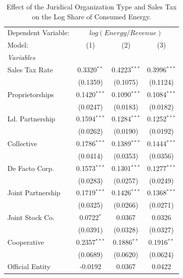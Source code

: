 \documentclass[
  12pt]{article}
\begin{document}
\begin{table}

\caption{\label{tbl-reg-energy}Effect of the Juridical Organization Type
and Sales Tax on the Log Share of Consumed Energy.}

\begin{minipage}{\linewidth}

\begingroup
\centering
\begin{tabular}{lccc}
   \tabularnewline \midrule \midrule
   Dependent Variable: & \multicolumn{3}{c}{\(log(Energy/Revenue)\)}\\
   Model:            & (1)            & (2)            & (3)\\  
   \midrule
   \emph{Variables}\\
   Sales Tax Rate    & 0.3320$^{**}$  & 0.4223$^{***}$ & 0.3996$^{***}$\\   
                     & (0.1359)       & (0.1075)       & (0.1124)\\   
   Proprietorships   & 0.1420$^{***}$ & 0.1090$^{***}$ & 0.1084$^{***}$\\   
                     & (0.0247)       & (0.0183)       & (0.0182)\\   
   Ld. Partnership   & 0.1594$^{***}$ & 0.1284$^{***}$ & 0.1252$^{***}$\\   
                     & (0.0262)       & (0.0190)       & (0.0192)\\   
   Collective        & 0.1786$^{***}$ & 0.1389$^{***}$ & 0.1444$^{***}$\\   
                     & (0.0414)       & (0.0353)       & (0.0356)\\   
   De Facto Corp.    & 0.1573$^{***}$ & 0.1301$^{***}$ & 0.1277$^{***}$\\   
                     & (0.0283)       & (0.0257)       & (0.0249)\\   
   Joint Partnership & 0.1719$^{***}$ & 0.1426$^{***}$ & 0.1368$^{***}$\\   
                     & (0.0325)       & (0.0266)       & (0.0271)\\   
   Joint Stock Co.   & 0.0722$^{*}$   & 0.0367         & 0.0326\\   
                     & (0.0391)       & (0.0328)       & (0.0327)\\   
   Cooperative       & 0.2357$^{***}$ & 0.1886$^{**}$  & 0.1916$^{**}$\\   
                     & (0.0689)       & (0.0620)       & (0.0624)\\   
   Official Entity   & -0.0192        & 0.0367         & 0.0422\\   

\end{tabular}
\end{minipage}
\end{table}
\end{document}
